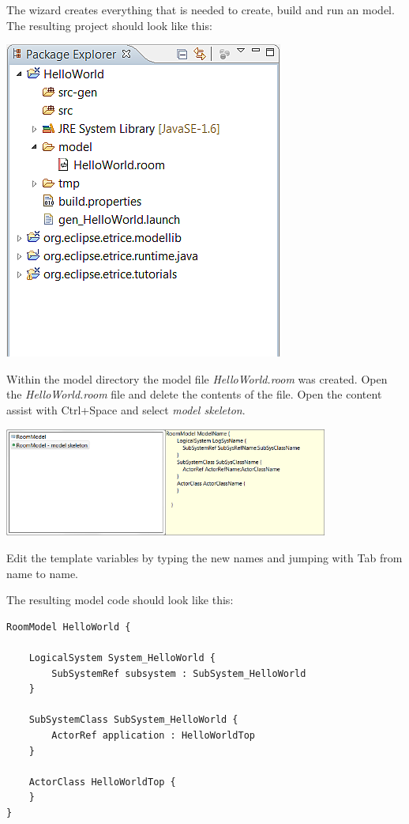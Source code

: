 The wizard creates everything that is needed to create, build and run an \eTrice{} model. The resulting 
project should look like this:

\includegraphics{images/015-HelloWorld11.png}

Within the model directory the model file \textit{HelloWorld.room} was created. Open the 
\textit{HelloWorld.room} file and delete the contents of the file. Open the content assist with Ctrl+Space 
and select \textit{model skeleton}.

\includegraphics[width=0.8\textwidth]{images/015-HelloWorld12.png}

Edit the template variables by typing the new names and jumping with Tab from name to name.

The resulting model code should look like this:

\begin{lstlisting}[language=ROOM]
RoomModel HelloWorld {

    LogicalSystem System_HelloWorld {
        SubSystemRef subsystem : SubSystem_HelloWorld
    }

    SubSystemClass SubSystem_HelloWorld {
        ActorRef application : HelloWorldTop
    }

    ActorClass HelloWorldTop {
    }
} 
\end{lstlisting}

